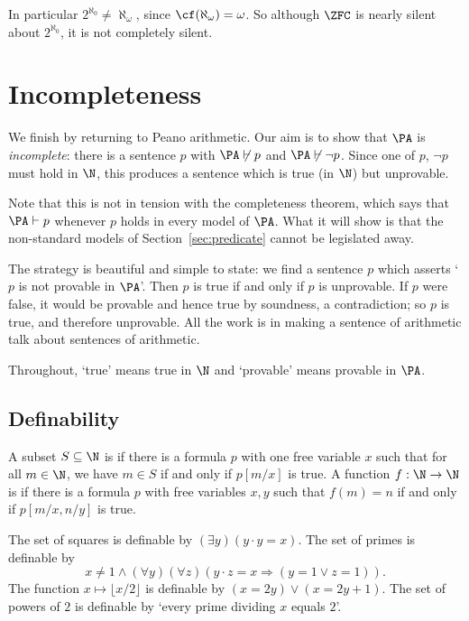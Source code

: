 In particular $2^{\aleph_0} \neq \aleph_\omega$, since $\cf(\aleph_\omega) = \omega$. So although $\ZFC$ is nearly silent about $2^{\aleph_0}$, it is not completely silent.

\section{Incompleteness}\label{sec:incompleteness}

We finish by returning to Peano arithmetic. Our aim is to show that $\PA$ is \emph{incomplete}: there is a sentence $p$ with $\PA \not\vdash p$ and $\PA \not\vdash \lnot p$. Since one of $p$, $\lnot p$ must hold in $\N$, this produces a sentence which is true (in $\N$) but unprovable.

Note that this is not in tension with the completeness theorem, which says that $\PA \vdash p$ whenever $p$ holds in every model of $\PA$. What it will show is that the non-standard models of Section~\ref{sec:predicate} cannot be legislated away.

The strategy is beautiful and simple to state: we find a sentence $p$ which asserts `$p$ is not provable in $\PA$'. Then $p$ is true if and only if $p$ is unprovable. If $p$ were false, it would be provable and hence true by soundness, a contradiction; so $p$ is true, and therefore unprovable. All the work is in making a sentence of arithmetic talk about sentences of arithmetic.

Throughout, `true' means true in $\N$ and `provable' means provable in $\PA$.

\subsection{Definability}

\begin{definition}[Definable]
  A subset $S \subseteq \N$ is  if there is a formula $p$ with one free variable $x$ such that for all $m \in \N$, we have $m \in S$ if and only if $p[m/x]$ is true. A function $f: \N \to \N$ is  if there is a formula $p$ with free variables $x, y$ such that $f(m) = n$ if and only if $p[m/x, n/y]$ is true.
\end{definition}

\begin{example}
  The set of squares is definable by $(\exists y)(y \cdot y = x)$. The set of primes is definable by
  $$x \neq 1 \land (\forall y)(\forall z)(y \cdot z = x \Rightarrow (y = 1 \lor z = 1)).$$
  The function $x \mapsto \lfloor x/2 \rfloor$ is definable by $(x = 2y) \lor (x = 2y + 1)$. The set of powers of $2$ is definable by `every prime dividing $x$ equals $2$'.
\end{example}

